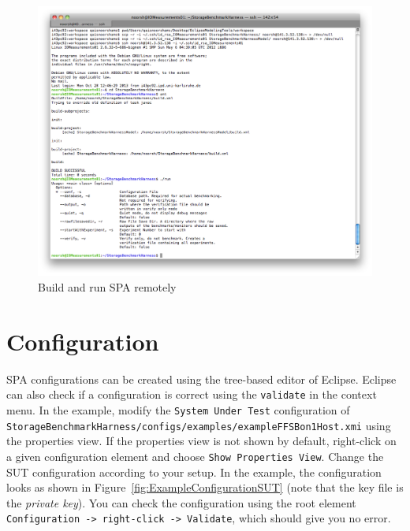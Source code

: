 \begin{figure}[htbp]
	\centering
	\includegraphics[scale=0.375]{graphics/example/RunRemote.png}
	\caption{Build and run SPA remotely}
 	\label{fig:ExampleRunRemote}
\end{figure}

\section{Configuration}

SPA configurations can be created using the tree-based editor of Eclipse. Eclipse can also check if a configuration is correct using the \texttt{validate} in the context menu. In the example, modify the \texttt{System Under Test} configuration of \texttt{StorageBenchmarkHarness/{\allowbreak}configs/examples/exampleFFSBon1Host.xmi} using the properties view. If the properties view is not shown by default, right-click on a given configuration element and choose \texttt{Show Properties View}. Change the SUT configuration according to your setup. In the example, the configuration looks as shown in Figure~\ref{fig:ExampleConfigurationSUT} (note that the key file is the \textit{private key}). You can check the configuration using the root element \texttt{Configuration -> right-click -> Validate}, which should give you no error.

